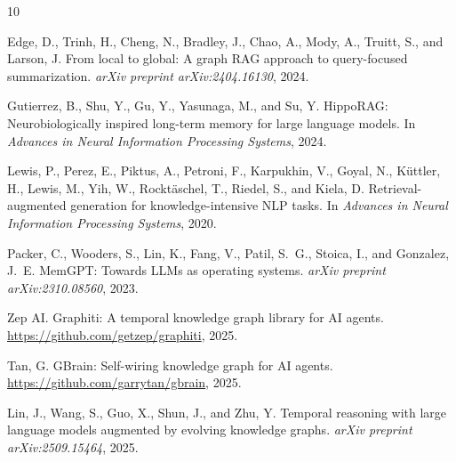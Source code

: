 \documentclass[11pt,a4paper]{article}
\begin{document}
\begin{thebibliography}{10}

Edge, D., Trinh, H., Cheng, N., Bradley, J., Chao, A., Mody, A., Truitt, S., and Larson, J.
\newblock From local to global: A graph RAG approach to query-focused summarization.
\newblock \emph{arXiv preprint arXiv:2404.16130}, 2024.

Gutierrez, B., Shu, Y., Gu, Y., Yasunaga, M., and Su, Y.
\newblock HippoRAG: Neurobiologically inspired long-term memory for large language models.
\newblock In \emph{Advances in Neural Information Processing Systems}, 2024.

Lewis, P., Perez, E., Piktus, A., Petroni, F., Karpukhin, V., Goyal, N., K{\"u}ttler, H., Lewis, M., Yih, W., Rockt{\"a}schel, T., Riedel, S., and Kiela, D.
\newblock Retrieval-augmented generation for knowledge-intensive NLP tasks.
\newblock In \emph{Advances in Neural Information Processing Systems}, 2020.

Packer, C., Wooders, S., Lin, K., Fang, V., Patil, S.~G., Stoica, I., and Gonzalez, J.~E.
\newblock MemGPT: Towards LLMs as operating systems.
\newblock \emph{arXiv preprint arXiv:2310.08560}, 2023.

{Zep AI}.
\newblock Graphiti: A temporal knowledge graph library for AI agents.
\newblock \url{https://github.com/getzep/graphiti}, 2025.

Tan, G.
\newblock GBrain: Self-wiring knowledge graph for AI agents.
\newblock \url{https://github.com/garrytan/gbrain}, 2025.

Lin, J., Wang, S., Guo, X., Shun, J., and Zhu, Y.
\newblock Temporal reasoning with large language models augmented by evolving knowledge graphs.
\newblock \emph{arXiv preprint arXiv:2509.15464}, 2025.

\end{thebibliography}
\end{document}
